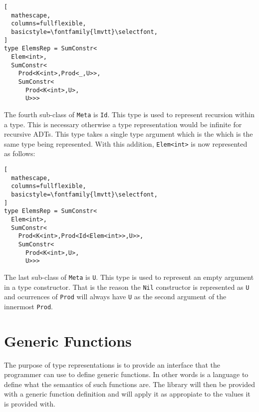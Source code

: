 \documentclass{sigplanconf}
\begin{document}
\begin{lstlisting}[
  mathescape,
  columns=fullflexible,
  basicstyle=\fontfamily{lmvtt}\selectfont,
]
type ElemsRep = SumConstr<
  Elem<int>,
  SumConstr<
    Prod<K<int>,Prod<_,U>>,
    SumConstr<
      Prod<K<int>,U>,
      U>>>
\end{lstlisting}
The fourth sub-class of \verb+Meta+ is \verb+Id+. This type is used to represent recursion within a type. This is necessary otherwise a type representation would be infinite for recursive ADTs. This type takes a single type argument which is the which is the same type being represented. With this addition, \verb+Elem<int>+ is now represented as follows:
\begin{lstlisting}[
  mathescape,
  columns=fullflexible,
  basicstyle=\fontfamily{lmvtt}\selectfont,
]
type ElemsRep = SumConstr<
  Elem<int>,
  SumConstr<
    Prod<K<int>,Prod<Id<Elem<int>>,U>>,
    SumConstr<
      Prod<K<int>,U>,
      U>>>
\end{lstlisting}
The last sub-class of \verb+Meta+ is \verb+U+. This type is used to represent an empty argument in a type constructor. That is the reason the \verb+Nil+ constructor is represented as \verb+U+ and ocurrences of \verb+Prod+ will always have \verb+U+ as the second argument of the innermost \verb+Prod+.
\section{Generic Functions}
The purpose of type representations is to provide an interface that the programmer can use to define generic functions. In other words is a language to define what the semantics of such functions are. The library will then be provided with a generic function definition and will apply it as appropiate to the values it is provided with.
\end{document}

